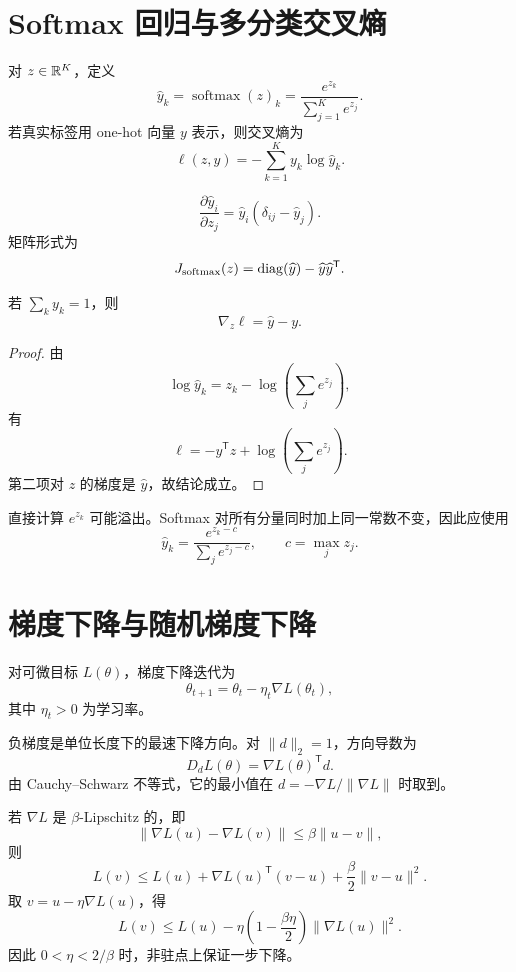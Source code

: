 \section{Softmax 回归与多分类交叉熵}

\begin{definition}[Softmax]
对 $z\in\mathbb{R}^K$，定义
\[
\widehat y_k
=\operatorname{softmax}(z)_k
=\frac{e^{z_k}}{\sum_{j=1}^Ke^{z_j}}.
\]
若真实标签用 one-hot 向量 $y$ 表示，则交叉熵为
\[
\ell(z,y)=-\sum_{k=1}^Ky_k\log\widehat y_k.
\]
\end{definition}

\begin{proposition}
\[
\frac{\partial\widehat y_i}{\partial z_j}
=\widehat y_i(\delta_{ij}-\widehat y_j).
\]
矩阵形式为
\[
J_{\mathrm{softmax}}(z)
=\operatorname{diag}(\widehat y)-\widehat y\widehat y^{\mathsf T}.
\]
\end{proposition}

\begin{theorem}
若 $\sum_ky_k=1$，则
\[
\boxed{\nabla_z\ell=\widehat y-y.}
\]
\end{theorem}
\begin{proof}
由
\[
\log\widehat y_k=z_k-
\log\left(\sum_je^{z_j}\right),
\]
有
\[
\ell=-y^{\mathsf T}z+
\log\left(\sum_je^{z_j}\right).
\]
第二项对 $z$ 的梯度是 $\widehat y$，故结论成立。
\end{proof}

\begin{pitfall}
直接计算 $e^{z_k}$ 可能溢出。Softmax 对所有分量同时加上同一常数不变，因此应使用
\[
\widehat y_k
=\frac{e^{z_k-c}}{\sum_je^{z_j-c}},
\qquad c=\max_jz_j.
\]
\end{pitfall}

\section{梯度下降与随机梯度下降}

\begin{definition}[梯度下降]
对可微目标 $L(\theta)$，梯度下降迭代为
\[
\theta_{t+1}=\theta_t-\eta_t\nabla L(\theta_t),
\]
其中 $\eta_t>0$ 为学习率。
\end{definition}

负梯度是单位长度下的最速下降方向。对 $\lVert d\rVert_2=1$，方向导数为
\[
D_dL(\theta)=\nabla L(\theta)^{\mathsf T}d.
\]
由 Cauchy--Schwarz 不等式，它的最小值在
$d=-\nabla L/\lVert\nabla L\rVert$ 时取到。

\begin{theorem}[光滑函数的下降引理]
若 $\nabla L$ 是 $\beta$-Lipschitz 的，即
\[
\lVert\nabla L(u)-\nabla L(v)\rVert
\le\beta\lVert u-v\rVert,
\]
则
\[
L(v)\le L(u)+\nabla L(u)^{\mathsf T}(v-u)
+\frac\beta2\lVert v-u\rVert^2.
\]
取 $v=u-\eta\nabla L(u)$，得
\[
L(v)\le L(u)-\eta\left(1-\frac{\beta\eta}{2}\right)
\lVert\nabla L(u)\rVert^2.
\]
因此 $0<\eta<2/\beta$ 时，非驻点上保证一步下降。
\end{theorem}

